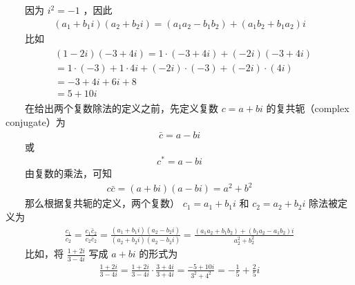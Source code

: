 \documentclass[a4paper,11pt,english]{sphinxmanual}
\begin{document}
\sphinxAtStartPar
  因为 \(i^{2}=-1\) ，因此
\begin{equation*}
\begin{split}\left(a_{1}+b_{1} i\right)\left(a_{2}+b_{2} i\right)=\left(a_{1} a_{2}-b_{1} b_{2}\right)+\left(a_{1} b_{2}+b_{1} a_{2}\right) i\end{split}
\end{equation*}
\sphinxAtStartPar
  比如
\begin{equation*}
\begin{split}\begin{aligned} &(1-2 i)(-3+4 i)=1 \cdot(-3+4 i)+(-2 i)(-3+4 i) \\ &=1 \cdot(-3)+1 \cdot 4 i+(-2 i) \cdot(-3)+(-2 i) \cdot(4 i) \\ &=-3+4 i+6 i+8 \\ &=5+10 i \end{aligned}\end{split}
\end{equation*}
\sphinxAtStartPar
  在给出两个复数除法的定义之前，先定义复数 \(c=a+b i\) 的复共轭（complex conjugate）为
\begin{equation*}
\begin{split}\bar{c}=a-b i\end{split}
\end{equation*}
\sphinxAtStartPar
  或
\begin{equation*}
\begin{split}c^{*}=a-b i\end{split}
\end{equation*}
\sphinxAtStartPar
  由复数的乘法，可知
\begin{equation*}
\begin{split}c \bar{c}=(a+b i)(a-b i)=a^{2}+b^{2}\end{split}
\end{equation*}
\sphinxAtStartPar
  那么根据复共轭的定义，两个复数） \(c_{1}=a_{1}+b_{1} i\) 和 \(c_{2}=a_{2}+b_{2} i\) 除法被定义为
\begin{equation*}
\begin{split}\frac{c_{1}}{c_{2}}=\frac{c_{1} \bar{c}_{2}}{c_{2} \bar{c}_{2}}=\frac{\left(a_{1}+b_{1} i\right)\left(a_{2}-b_{2} i\right)}{\left(a_{2}+b_{2} i\right)\left(a_{2}-b_{2} i\right)}=\frac{\left(a_{1} a_{2}+b_{1} b_{2}\right)+\left(b_{1} a_{2}-a_{1} b_{2}\right) i}{a_{2}^{2}+b_{2}^{2}}\end{split}
\end{equation*}
\sphinxAtStartPar
  比如，将 \(\frac{1+2 i}{3-4 i}\) 写成 \(a+b i\) 的形式为
\begin{equation*}
\begin{split}\frac{1+2 i}{3-4 i}=\frac{1+2 i}{3-4 i} \cdot \frac{3+4 i}{3+4 i}=\frac{-5+10 i}{3^{2}+4^{2}}=-\frac{1}{5}+\frac{2}{5} i\end{split}
\end{equation*}
\end{document}
